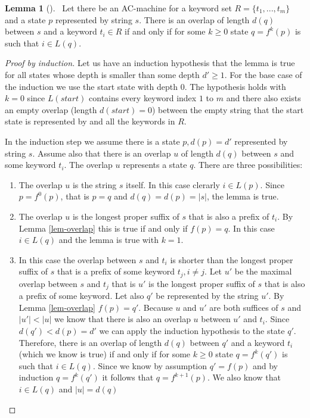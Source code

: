 \documentclass[english,twoside,censored,csm,algorithms-track-2020]{HYthesisML}
\theoremstyle{plain}
\theoremstyle{definition}
\newtheorem{lemma}[theorem]{Lemma}
\begin{document}


\begin{lemma}[] ~\label{lem-overlap-length}
  Let there be an AC-machine for a keyword set $R=\{t_1,...,t_m\}$ and a state $p$ represented
  by string $s$.
  There is an overlap of length $d(q)$ between $s$ and a keyword $t_i\in R$ if and only if
  for some $k \geq 0$ state $q=f^k(p)$ is such that $i\in L(q)$.
\end{lemma}
\begin{proof}[Proof by induction]
  Let us have an induction hypothesis that the lemma is true for all states whose depth is
  smaller than some depth $d'\geq 1$. For the base case of the induction we use the start state
  with depth 0. The hypothesis holds
  with $k=0$ since $L(start)$ contains every keyword index $1$ to $m$ and there also exists an empty
  overlap (length $d(start)=0$) between the empty string that the start state is represented by and all
  the keywords in $R$.

  In the induction step we assume there is a state $p, d(p) = d'$ represented by string $s$.
  Assume also that there is an overlap $u$ of length $d(q)$ between $s$ and some keyword $t_i$. The
  overlap $u$ represents a state $q$.
  There are three possibilities:
  \begin{enumerate}
  \item The overlap $u$ is the string $s$ itself. In this case clerarly $i\in L(p)$. Since
    $p=f^0(p)$, that is $p=q$ and $d(q) = d(p) = |s|$, the lemma is true. 
  \item The overlap $u$ is the longest proper suffix of $s$ that is also a prefix of $t_i$.
    By Lemma \ref{lem-overlap} this is true if and only if $f(p) = q$. In this case
    $i\in L(q)$ and the lemma is true with $k=1$.
  \item In this case the overlap between $s$ and $t_i$ is shorter than the longest proper
    suffix of $s$ that is a prefix of some keyword $t_j, i\neq j$. Let $u'$ be the maximal
    overlap between $s$ and $t_j$ that is $u'$ is the longest proper suffix of $s$ that is also
    a prefix of some keyword. Let also $q'$ be represented by the string $u'$. By Lemma
    \ref{lem-overlap} $f(p) = q'$. Because $u$ and $u'$ are both suffices of $s$ and $|u'|<|u|$ we
    know that there is also an overlap $u$ between $u'$ and $t_i$. Since $d(q') < d(p) = d'$ we can
    apply the induction hypothesis to the state $q'$. Therefore, there is an overlap of length
    $d(q)$ between $q'$ and a keyword $t_i$ (which we know is true) if and only if for some
    $k \geq 0$ state $q=f^k(q')$ is such that $i\in L(q)$. Since we know by assumption $q'=f(p)$ and
    by induction $q=f^k(q')$ it follows that $q=f^{k+1}(p)$. We also know that $i\in L(q)$ and
    $|u|=d(q)$
  \end{enumerate}
\end{proof}
\end{document}
